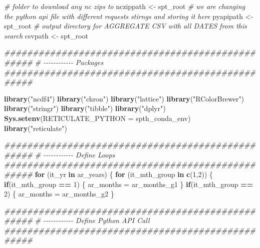 \documentclass[
]{book}
\newenvironment{Shaded}{\begin{snugshade}}{\end{snugshade}}
\newcommand{\CommentTok}[1]{\textcolor[rgb]{0.56,0.35,0.01}{\textit{#1}}}
\newcommand{\ControlFlowTok}[1]{\textcolor[rgb]{0.13,0.29,0.53}{\textbf{#1}}}
\newcommand{\DataTypeTok}[1]{\textcolor[rgb]{0.13,0.29,0.53}{#1}}
\newcommand{\DecValTok}[1]{\textcolor[rgb]{0.00,0.00,0.81}{#1}}
\newcommand{\KeywordTok}[1]{\textcolor[rgb]{0.13,0.29,0.53}{\textbf{#1}}}
\newcommand{\NormalTok}[1]{#1}
\newcommand{\OperatorTok}[1]{\textcolor[rgb]{0.81,0.36,0.00}{\textbf{#1}}}
\newcommand{\StringTok}[1]{\textcolor[rgb]{0.31,0.60,0.02}{#1}}
\begin{document}
\begin{Shaded}
\begin{Highlighting}[]
\CommentTok{\# folder to download any nc zips to}
\NormalTok{nczippath \textless{}{-}}\StringTok{ }\NormalTok{spt\_root}
\CommentTok{\# we are changing the python api file with different requests stirngs and storing it here}
\NormalTok{pyapipath \textless{}{-}}\StringTok{ }\NormalTok{spt\_root}
\CommentTok{\# output directory for AGGREGATE CSV with all DATES from this search}
\NormalTok{csvpath \textless{}{-}}\StringTok{ }\NormalTok{spt\_root}

\CommentTok{\#\#\#\#\#\#\#\#\#\#\#\#\#\#\#\#\#\#\#\#\#\#\#\#\#\#\#\#\#\#\#\#\#\#\#\#\#\#\#\#\#\#\#\#\#\#\#\#\#}
\CommentTok{\# {-}{-}{-}{-}{-}{-}{-}{-}{-}{-}{-}{-} Packages}
\CommentTok{\#\#\#\#\#\#\#\#\#\#\#\#\#\#\#\#\#\#\#\#\#\#\#\#\#\#\#\#\#\#\#\#\#\#\#\#\#\#\#\#\#\#\#\#\#\#\#\#\#}

\KeywordTok{library}\NormalTok{(}\StringTok{"ncdf4"}\NormalTok{)}
\KeywordTok{library}\NormalTok{(}\StringTok{"chron"}\NormalTok{)}
\KeywordTok{library}\NormalTok{(}\StringTok{"lattice"}\NormalTok{)}
\KeywordTok{library}\NormalTok{(}\StringTok{"RColorBrewer"}\NormalTok{)}
\KeywordTok{library}\NormalTok{(}\StringTok{"stringr"}\NormalTok{)}
\KeywordTok{library}\NormalTok{(}\StringTok{"tibble"}\NormalTok{)}
\KeywordTok{library}\NormalTok{(}\StringTok{"dplyr"}\NormalTok{)}
\KeywordTok{Sys.setenv}\NormalTok{(}\DataTypeTok{RETICULATE\_PYTHON =}\NormalTok{ spth\_conda\_env)}
\KeywordTok{library}\NormalTok{(}\StringTok{"reticulate"}\NormalTok{)}

\CommentTok{\#\#\#\#\#\#\#\#\#\#\#\#\#\#\#\#\#\#\#\#\#\#\#\#\#\#\#\#\#\#\#\#\#\#\#\#\#\#\#\#\#\#\#\#\#\#\#\#\#}
\CommentTok{\# {-}{-}{-}{-}{-}{-}{-}{-}{-}{-}{-}{-} Define Loops}
\CommentTok{\#\#\#\#\#\#\#\#\#\#\#\#\#\#\#\#\#\#\#\#\#\#\#\#\#\#\#\#\#\#\#\#\#\#\#\#\#\#\#\#\#\#\#\#\#\#\#\#\#}
\ControlFlowTok{for}\NormalTok{ (it\_yr }\ControlFlowTok{in}\NormalTok{ ar\_years) \{}
  \ControlFlowTok{for}\NormalTok{ (it\_mth\_group }\ControlFlowTok{in} \KeywordTok{c}\NormalTok{(}\DecValTok{1}\NormalTok{,}\DecValTok{2}\NormalTok{)) \{}
    \ControlFlowTok{if}\NormalTok{(it\_mth\_group }\OperatorTok{==}\StringTok{ }\DecValTok{1}\NormalTok{) \{}
\NormalTok{      ar\_months =}\StringTok{ }\NormalTok{ar\_months\_g1}
\NormalTok{    \}}
    \ControlFlowTok{if}\NormalTok{(it\_mth\_group }\OperatorTok{==}\StringTok{ }\DecValTok{2}\NormalTok{) \{}
\NormalTok{      ar\_months =}\StringTok{ }\NormalTok{ar\_months\_g2}
\NormalTok{    \}}

    \CommentTok{\#\#\#\#\#\#\#\#\#\#\#\#\#\#\#\#\#\#\#\#\#\#\#\#\#\#\#\#\#\#\#\#\#\#\#\#\#\#\#\#\#\#\#\#\#\#\#\#\#}
    \CommentTok{\# {-}{-}{-}{-}{-}{-}{-}{-}{-}{-}{-}{-} Define Python API Call}
    \CommentTok{\#\#\#\#\#\#\#\#\#\#\#\#\#\#\#\#\#\#\#\#\#\#\#\#\#\#\#\#\#\#\#\#\#\#\#\#\#\#\#\#\#\#\#\#\#\#\#\#\#}


\end{Highlighting}
\end{Shaded}
\end{document}
